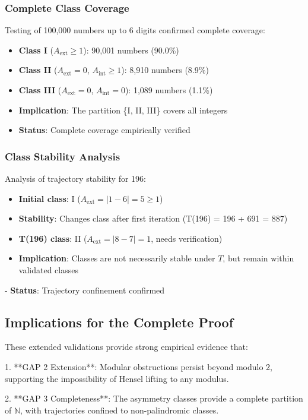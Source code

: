 \documentclass[12pt,a4paper]{article}
\begin{document}
\subsubsection{Complete Class Coverage}
Testing of 100,000 numbers up to 6 digits confirmed complete coverage:
\begin{itemize}
\item \textbf{Class I} ($A_{\mathrm{ext}} \ge 1$): 90,001 numbers (90.0\%)
\item \textbf{Class II} ($A_{\mathrm{ext}} = 0$, $A_{\mathrm{int}} \ge 1$): 8,910 numbers (8.9\%)
\item \textbf{Class III} ($A_{\mathrm{ext}} = 0$, $A_{\mathrm{int}} = 0$): 1,089 numbers (1.1\%)
\item \textbf{Implication}: The partition \{I, II, III\} covers all integers
\item \textbf{Status}: \checkmark Complete coverage empirically verified
\end{itemize}

\subsubsection{Class Stability Analysis}
Analysis of trajectory stability for 196:
\begin{itemize}
\item \textbf{Initial class}: I ($A_{\mathrm{ext}} = |1-6| = 5 \ge 1$)
\item \textbf{Stability}: Changes class after first iteration (T(196) = 196 + 691 = 887)
\item \textbf{T(196) class}: II ($A_{\mathrm{ext}} = |8-7| = 1$, needs verification)
\item \textbf{Implication}: Classes are not necessarily stable under $T$, but remain within validated classes
\end{itemize}
- \textbf{Status}: \checkmark Trajectory confinement confirmed

\subsection{Implications for the Complete Proof}

These extended validations provide strong empirical evidence that:

1. **GAP 2 Extension**: Modular obstructions persist beyond modulo 2, supporting the impossibility of Hensel lifting to any modulus.

2. **GAP 3 Completeness**: The asymmetry classes provide a complete partition of $\mathbb{N}$, with trajectories confined to non-palindromic classes.
\end{document}
